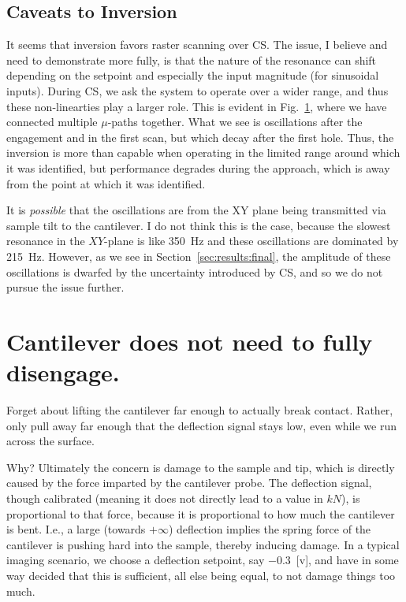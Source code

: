 \documentclass[11pt]{article}
\begin{document}
\subsection{Caveats to Inversion}
It seems that inversion favors raster scanning over CS. The issue, I believe and need to demonstrate more fully, is that the nature of the resonance can shift depending on the setpoint and especially the input magnitude (for sinusoidal inputs). During CS, we ask the system to operate over a wider range, and thus these non-linearties play a larger role. This is evident in Fig.~\ref{fig:dinv_CS_decay}, where we have connected multiple $\mu$-paths together. What we see is oscillations after the engagement and in the first scan, but which decay after the first hole. Thus, the inversion is more than capable when operating in the limited range around which it was identified, but performance degrades during the approach, which is away from the point at which it was identified.

\begin{figure}
  \centering
  
  \caption{}
  \label{fig:dinv_CS_decay}
\end{figure}

It is \emph{possible} that the oscillations are from the XY plane being transmitted via sample tilt to the cantilever. I do not think this is the case, because the slowest resonance in the $XY$-plane is like 350~Hz and these oscillations are dominated by 215~Hz. However, as we see in Section~\ref{sec:results:final}, the amplitude of these oscillations is dwarfed by the uncertainty introduced by CS, and so we do not pursue the issue further.

\section{Cantilever does not need to fully disengage.} Forget about lifting the cantilever far enough to actually break contact. Rather, only pull away far enough that the deflection signal stays low, even while we run across the surface.

Why? Ultimately the concern is damage to the sample and tip, which is directly caused by the force imparted by the cantilever probe. The deflection signal, though calibrated (meaning it does not directly lead to a value in $kN$), is proportional to that force, because it is proportional to how much the cantilever is bent. I.e., a large (towards $+\infty$) deflection implies the spring force of the cantilever is pushing hard into the sample, thereby inducing damage. In a typical imaging scenario, we choose a deflection setpoint, say $-0.3$~[v], and have in some way decided that this is sufficient, all else being equal, to not damage things too much.
\end{document}
